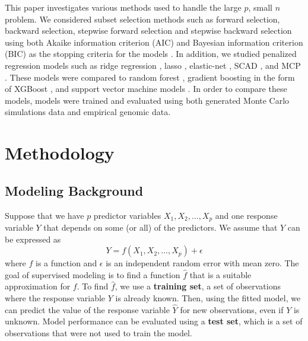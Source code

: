 \documentclass{article}
\begin{document}

This paper investigates various methods used to handle the large $p$, small $n$ problem. We considered subset selection methods such as forward selection, backward selection, stepwise forward selection and stepwise backward selection using both Akaike information criterion (AIC) and Bayesian information criterion (BIC) as the stopping criteria for the models \cite{akaike1998information, schwarz1978estimating}. In addition, we studied penalized regression models such as ridge regression \cite{hoerl1970ridge}, lasso \cite{tibshirani1996regression}, elastic-net \cite{zou2005regularization}, SCAD \cite{fan2001variable}, and MCP \cite{zhang2010nearly}. These models were compared to random forest \cite{breiman2001random}, gradient boosting in the form of XGBoost \cite{chen2021xgboost}, and support vector machine models \cite{cortes1995support}. In order to compare these models, models were trained and evaluated using both generated Monte Carlo simulations data and empirical genomic data.

\section{Methodology}
\subsection{Modeling Background}


Suppose that we have $p$ predictor variables $X_1, X_2, \dotsc, X_p$ and one response variable $Y$ that depends on some (or all) of the predictors. We assume that $Y$ can be expressed as
\begin{equation}\label{eqn:relationship}
	Y = f(X_1, X_2, \dotsc, X_p) + \epsilon
\end{equation}
where $f$ is a function and $\epsilon$ is an independent random error with mean zero. The goal of supervised modeling is to find a function $\hat{f}$ that is a suitable approximation for $f$. To find $\hat{f}$, we use a \textbf{training set}, a set of observations where the response variable $Y$ is already known. Then, using the fitted model, we can predict the value of the response variable $\hat{Y}$ for new observations, even if $Y$ is unknown. Model performance can be evaluated using a \textbf{test set}, which is a set of observations that were not used to train the model.
\end{document}

